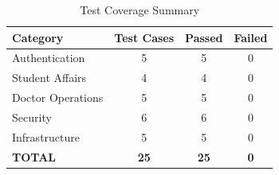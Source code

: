 \begin{table}[H]
    \centering
    \renewcommand{\arraystretch}{1.3}
    \begin{tabular}{|l|c|c|c|}
        \hline
        \textbf{Category} & \textbf{Test Cases} & \textbf{Passed} & \textbf{Failed} \\
        \hline
        Authentication & 5 & 5 & 0 \\
        \hline
        Student Affairs & 4 & 4 & 0 \\
        \hline
        Doctor Operations & 5 & 5 & 0 \\
        \hline
        Security & 6 & 6 & 0 \\
        \hline
        Infrastructure & 5 & 5 & 0 \\
        \hline
        \textbf{TOTAL} & \textbf{25} & \textbf{25} & \textbf{0} \\
        \hline
    \end{tabular}
    \caption{Test Coverage Summary}
\end{table}
